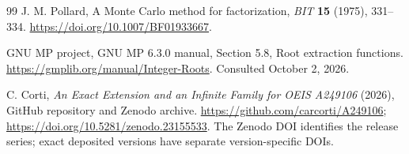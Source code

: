 \documentclass[11pt,a4paper]{article}
\theoremstyle{remark}
\begin{document}
\begin{thebibliography}{99}
J. M. Pollard, A Monte Carlo method for factorization,
\emph{BIT} \textbf{15} (1975), 331--334.
\url{https://doi.org/10.1007/BF01933667}.

GNU MP project, GNU MP 6.3.0 manual, Section 5.8, Root extraction functions.
\url{https://gmplib.org/manual/Integer-Roots}. Consulted October 2, 2026.

C. Corti, \emph{An Exact Extension and an Infinite Family for OEIS A249106}
(2026), GitHub repository and Zenodo archive.
\url{https://github.com/carcorti/A249106};
\url{https://doi.org/10.5281/zenodo.23155533}.
The Zenodo DOI identifies the release series; exact deposited versions have
separate version-specific DOIs.
\end{thebibliography}
\end{document}
